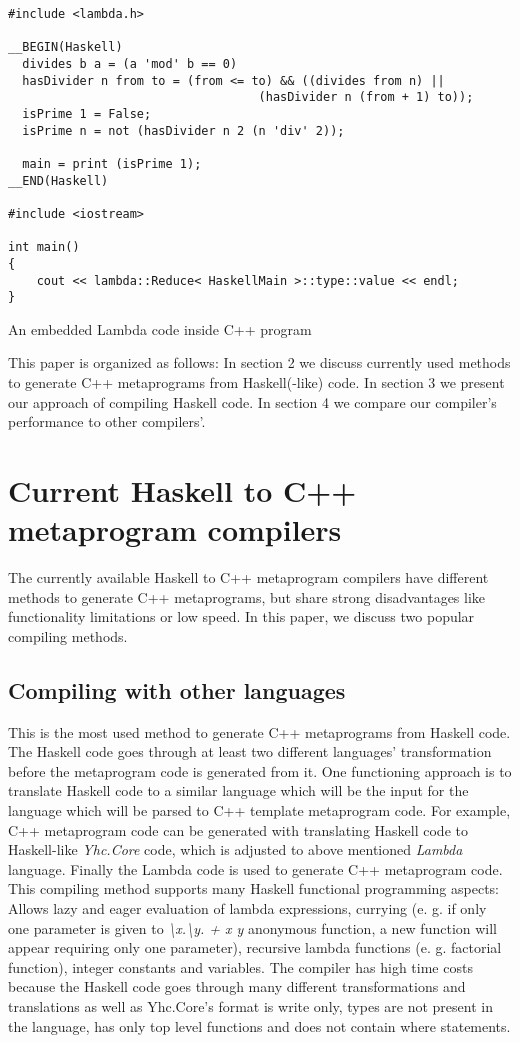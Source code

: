 \documentclass{article}
\begin{document}
\begin{center}
\begin{lstlisting}
#include <lambda.h>

__BEGIN(Haskell)
  divides b a = (a 'mod' b == 0)
  hasDivider n from to = (from <= to) && ((divides from n) ||
                                   (hasDivider n (from + 1) to));
  isPrime 1 = False;
  isPrime n = not (hasDivider n 2 (n 'div' 2));

  main = print (isPrime 1);
__END(Haskell)

#include <iostream>

int main()
{
	cout << lambda::Reduce< HaskellMain >::type::value << endl;
}
\end{lstlisting}
An embedded Lambda\cite{porkolab2009functional} code inside C++ program
\end{center}
This paper is organized as follows: In section 2 we discuss currently used methods to generate C++ metaprograms from Haskell(-like) code. In section 3 we present our approach of compiling Haskell code. In section 4 we compare our compiler's performance to other compilers'.
\section{Current Haskell to C++ metaprogram compilers}
The currently available Haskell to C++ metaprogram compilers have different methods to generate C++ metaprograms, but share strong disadvantages like functionality limitations or low speed. In this paper, we discuss two popular compiling methods.
\subsection{Compiling with other languages}
This is the most used method to generate C++ metaprograms from Haskell code. The Haskell code goes through at least two different languages' transformation before the metaprogram code is generated from it. One functioning approach is to translate Haskell code to a similar language which will be the input for the language which will be parsed to C++ template metaprogram code. For example, C++ metaprogram code can be generated with translating Haskell code to Haskell-like \textit{Yhc.Core} code, which is adjusted to above mentioned \textit{Lambda} language. Finally the Lambda code is used to generate C++ metaprogram code.\cite{porkolab2009c++} This compiling method supports many Haskell functional programming aspects: Allows lazy and eager evaluation of lambda expressions, currying (e. g. if only one parameter is given to \textit{\textbackslash x.\textbackslash y. + x y} anonymous function, a new function will appear requiring only one parameter), recursive lambda functions (e. g. factorial function), integer constants and variables. The compiler has high time costs because the Haskell code goes through many different transformations and translations as well as Yhc.Core's format is write only, types are not present in the language, has only top level functions and does not contain where statements.\cite{yhc}
\end{document}
